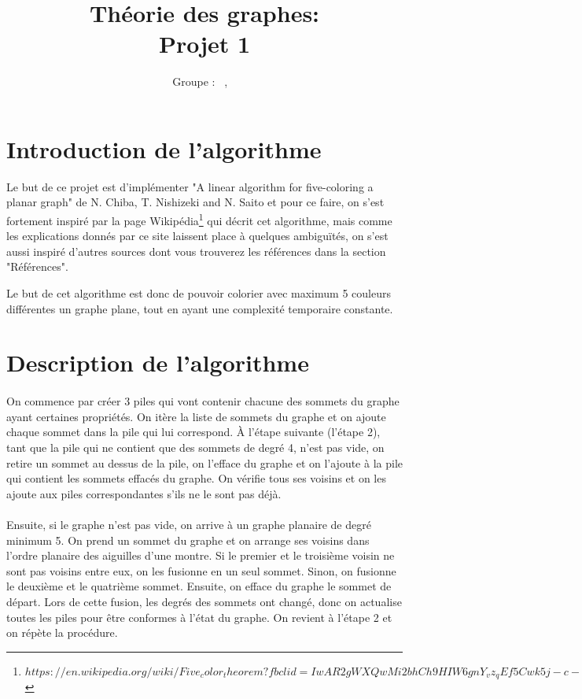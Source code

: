 \documentclass[a4paper, 11pt, oneside]{article}
\title{Théorie des graphes: \\ Projet 1\intitule}
\author{Groupe \GrNbr : \PrenomUN~\textsc{\NomUN}, \PrenomDEUX~\textsc{\NomDEUX}}
\date{}
\begin{document}
	\maketitle
	
	\newpage
	
	\section{Introduction de l'algorithme}
	Le but de ce projet est d'implémenter "A linear algorithm for five-coloring a planar graph" de N. Chiba, T. Nishizeki and N. Saito et pour ce faire, on s'est fortement inspiré par la page Wikipédia\footnote{$https://en.wikipedia.org/wiki/Five_color_theorem?fbclid=IwAR2gWXQwMi2bhCh9HIW6gnY_vz_qEf5Cwk5j-c-YYZk23LTf-KPZSMsBNJY$} qui décrit cet algorithme, mais comme les explications donnés par ce site laissent place à quelques ambiguïtés, on s'est aussi inspiré d'autres sources dont vous trouverez les références dans la section "Références".
	\par Le but de cet algorithme est donc de pouvoir colorier avec maximum 5 couleurs différentes un graphe plane, tout en ayant une complexité temporaire constante.

	\section{Description de l'algorithme}
	\paragraph*{}
	On commence par créer 3 piles qui vont contenir chacune des sommets du graphe ayant certaines propriétés. On itère la liste de sommets du graphe et on ajoute chaque sommet dans la pile qui lui correspond. À l'étape suivante (l'étape 2), tant que la pile qui ne contient que des sommets de degré 4, n'est pas vide, on retire un sommet au dessus de la pile, on l'efface du graphe et on l'ajoute à la pile qui contient les sommets effacés du graphe. On vérifie tous ses voisins et on les ajoute aux piles correspondantes s'ils ne le sont pas déjà.
	\paragraph{}
	Ensuite, si le graphe n'est pas vide, on arrive à un graphe planaire de degré minimum 5. On prend un sommet du graphe et on arrange ses voisins dans l'ordre planaire des aiguilles d'une montre. Si le premier et le troisième voisin ne sont pas voisins entre eux, on les fusionne en un seul sommet. Sinon, on fusionne le deuxième et le quatrième sommet. Ensuite, on efface du graphe le sommet de départ. Lors de cette fusion, les degrés des sommets ont changé, donc on actualise toutes les piles pour être conformes à l'état du graphe. On revient à l'étape 2 et on répète la procédure.
\end{document}
